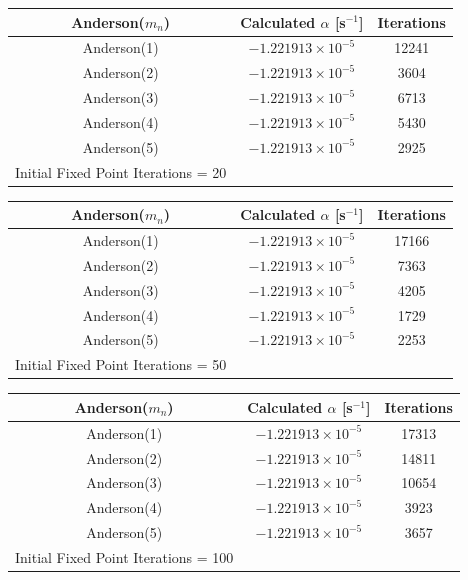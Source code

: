 \begin{table}[!htbp]\ContinuedFloat
	\begin{subtable}[h]{1.0\textwidth}
	\centering{}
	\begin{tabular}{@{}ccc@{}}\toprule
	Anderson($m_{n}$) & Calculated $\alpha$ [s$^{-1}$] & Iterations \\
	\midrule
	Anderson(1) & $-1.221913 \times 10^{-5}$ & 12241 \\
	Anderson(2) & $-1.221913 \times 10^{-5}$ & 3604  \\
	Anderson(3) & $-1.221913 \times 10^{-5}$ & 6713  \\
	Anderson(4) & $-1.221913 \times 10^{-5}$ & 5430  \\
	Anderson(5) & $-1.221913 \times 10^{-5}$ & 2925  \\
	\bottomrule
	Initial Fixed Point Iterations = 20
	\end{tabular}
	\end{subtable}%
	\vspace{0.25cm}
	\begin{subtable}[h]{1.0\textwidth}
	\centering{}
	\begin{tabular}{@{}ccc@{}}\toprule
	Anderson($m_{n}$) & Calculated $\alpha$ [s$^{-1}$] & Iterations \\
	\midrule
	Anderson(1) & $-1.221913 \times 10^{-5}$ & 17166 \\
	Anderson(2) & $-1.221913 \times 10^{-5}$ & 7363 \\
	Anderson(3) & $-1.221913 \times 10^{-5}$ & 4205 \\
	Anderson(4) & $-1.221913 \times 10^{-5}$ & 1729 \\
	Anderson(5) & $-1.221913 \times 10^{-5}$ & 2253 \\
	\bottomrule
	Initial Fixed Point Iterations = 50
	\end{tabular}
	\end{subtable}%
	\vspace{0.25cm}
	\begin{subtable}[h]{1.0\textwidth}
	\centering{}
	\begin{tabular}{@{}ccc@{}}\toprule
	Anderson($m_{n}$) & Calculated $\alpha$ [s$^{-1}$] & Iterations \\
	\midrule
	Anderson(1) & $-1.221913 \times 10^{-5}$ & 17313 \\
	Anderson(2) & $-1.221913 \times 10^{-5}$ & 14811 \\
	Anderson(3) & $-1.221913 \times 10^{-5}$ & 10654 \\
	Anderson(4) & $-1.221913 \times 10^{-5}$ & 3923 \\
	Anderson(5) & $-1.221913 \times 10^{-5}$ & 3657 \\
	\bottomrule
	Initial Fixed Point Iterations = 100
	\end{tabular}
	\end{subtable}
\end{table}

